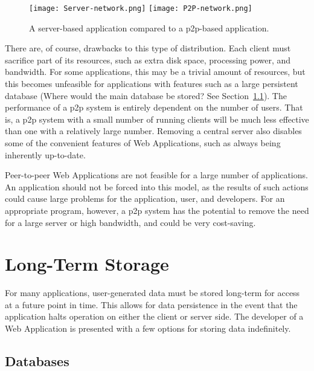 \documentclass{acmsmall}
\begin{document}
\begin{figure}[h]
\begin{center}
\texttt{[image: Server-network.png]}
\texttt{[image: P2P-network.png]}
\caption{A server-based application compared to a p2p-based application\cite{wikimedia}.}
\end{center}
\label{fig:p2p-server}
\end{figure}

There are, of course, drawbacks to this type of distribution.  Each client must sacrifice part of its resources, such as extra disk space, processing power, and bandwidth.  For some applications, this may be a trivial amount of resources, but this becomes unfeasible for applications with features such as a large persistent database (Where would the main database be stored?  See Section~\ref{sec:dbes}).  The performance of a p2p system is entirely dependent on the number of users.  That is, a p2p system with a small number of running clients will be much less effective than one with a relatively large number.  Removing a central server also disables some of the convenient features of Web Applications, such as always being inherently up-to-date.

Peer-to-peer Web Applications are not feasible for a large number of applications.  An application should not be forced into this model, as the results of such actions could cause large problems for the application, user, and developers.  For an appropriate program, however, a p2p system has the potential to remove the need for a large server or high bandwidth, and could be very cost-saving.

\section{Long-Term Storage}

For many applications, user-generated data must be stored long-term for access at a future point in time.  This allows for data persistence in the event that the application halts operation on either the client or server side.  The developer of a Web Application is presented with a few options for storing data indefinitely.

\subsection{Databases}
\label{sec:dbes}
\end{document}
